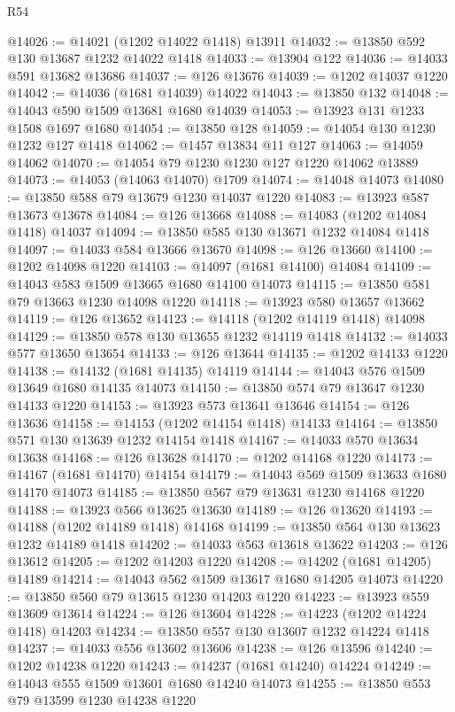 \begin{lexlean}{R54}
\begin{coremodule}
@14026 := @14021 (@1202 @14022 @1418) @13911
@14032 := @13850 @592 @130 @13687 @1232 @14022 @1418
@14033 := @13904 @122
@14036 := @14033 @591 @13682 @13686
@14037 := @126 @13676
@14039 := @1202 @14037 @1220
@14042 := @14036 (@1681 @14039) @14022
@14043 := @13850 @132
@14048 := @14043 @590 @1509 @13681 @1680 @14039
@14053 := @13923 @131 @1233 @1508 @1697 @1680
@14054 := @13850 @128
@14059 := @14054 @130 @1230 @1232 @127 @1418
@14062 := @1457 @13834 @11 @127
@14063 := @14059 @14062
@14070 := @14054 @79 @1230 @1230 @127 @1220 @14062 @13889
@14073 := @14053 (@14063 @14070) @1709
@14074 := @14048 @14073
@14080 := @13850 @588 @79 @13679 @1230 @14037 @1220
@14083 := @13923 @587 @13673 @13678
@14084 := @126 @13668
@14088 := @14083 (@1202 @14084 @1418) @14037
@14094 := @13850 @585 @130 @13671 @1232 @14084 @1418
@14097 := @14033 @584 @13666 @13670
@14098 := @126 @13660
@14100 := @1202 @14098 @1220
@14103 := @14097 (@1681 @14100) @14084
@14109 := @14043 @583 @1509 @13665 @1680 @14100 @14073
@14115 := @13850 @581 @79 @13663 @1230 @14098 @1220
@14118 := @13923 @580 @13657 @13662
@14119 := @126 @13652
@14123 := @14118 (@1202 @14119 @1418) @14098
@14129 := @13850 @578 @130 @13655 @1232 @14119 @1418
@14132 := @14033 @577 @13650 @13654
@14133 := @126 @13644
@14135 := @1202 @14133 @1220
@14138 := @14132 (@1681 @14135) @14119
@14144 := @14043 @576 @1509 @13649 @1680 @14135 @14073
@14150 := @13850 @574 @79 @13647 @1230 @14133 @1220
@14153 := @13923 @573 @13641 @13646
@14154 := @126 @13636
@14158 := @14153 (@1202 @14154 @1418) @14133
@14164 := @13850 @571 @130 @13639 @1232 @14154 @1418
@14167 := @14033 @570 @13634 @13638
@14168 := @126 @13628
@14170 := @1202 @14168 @1220
@14173 := @14167 (@1681 @14170) @14154
@14179 := @14043 @569 @1509 @13633 @1680 @14170 @14073
@14185 := @13850 @567 @79 @13631 @1230 @14168 @1220
@14188 := @13923 @566 @13625 @13630
@14189 := @126 @13620
@14193 := @14188 (@1202 @14189 @1418) @14168
@14199 := @13850 @564 @130 @13623 @1232 @14189 @1418
@14202 := @14033 @563 @13618 @13622
@14203 := @126 @13612
@14205 := @1202 @14203 @1220
@14208 := @14202 (@1681 @14205) @14189
@14214 := @14043 @562 @1509 @13617 @1680 @14205 @14073
@14220 := @13850 @560 @79 @13615 @1230 @14203 @1220
@14223 := @13923 @559 @13609 @13614
@14224 := @126 @13604
@14228 := @14223 (@1202 @14224 @1418) @14203
@14234 := @13850 @557 @130 @13607 @1232 @14224 @1418
@14237 := @14033 @556 @13602 @13606
@14238 := @126 @13596
@14240 := @1202 @14238 @1220
@14243 := @14237 (@1681 @14240) @14224
@14249 := @14043 @555 @1509 @13601 @1680 @14240 @14073
@14255 := @13850 @553 @79 @13599 @1230 @14238 @1220

\end{coremodule}
\end{lexlean}
